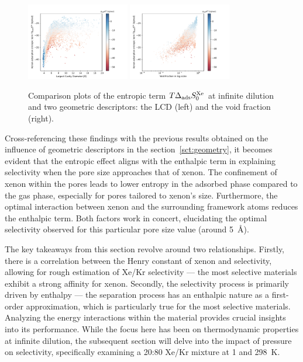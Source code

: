 \documentclass[main.tex]{subfiles}
\begin{document}
\begin{figure}
  \centering
  \includegraphics[width=0.4\textwidth]{figures/2-thermo/Scatterplot_entropy_lcd.pdf}
  \includegraphics[width=0.4\textwidth]{figures/2-thermo/Scatterplot_entropy_vf.pdf}
  \caption{Comparison plots of the entropic term $T\Delta_{\text{ads}}S^{\text{Xe}}_{\text{0}}$ at infinite dilution and two geometric descriptors: the LCD (left) and the void fraction (right).}\label{fgr:entropy_geometry}
\end{figure}

Cross-referencing these findings with the previous results obtained on the influence of geometric descriptors in the section~\ref{sct:geometry}, it becomes evident that the entropic effect aligns with the enthalpic term in explaining selectivity when the pore size approaches that of xenon. The confinement of xenon within the pores leads to lower entropy in the adsorbed phase compared to the gas phase, especially for pores tailored to xenon's size. Furthermore, the optimal interaction between xenon and the surrounding framework atoms reduces the enthalpic term. Both factors work in concert, elucidating the optimal selectivity observed for this particular pore size value (around \SI{5}{\angstrom}).

The key takeaways from this section revolve around two relationships. Firstly, there is a correlation between the Henry constant of xenon and selectivity, allowing for rough estimation of Xe/Kr selectivity --- the most selective materials exhibit a strong affinity for xenon. Secondly, the selectivity process is primarily driven by enthalpy --- the separation process has an enthalpic nature as a first-order approximation, which is particularly true for the most selective materials. Analyzing the energy interactions within the material provides crucial insights into its performance. While the focus here has been on thermodynamic properties at infinite dilution, the subsequent section will delve into the impact of pressure on selectivity, specifically examining a 20:80 Xe/Kr mixture at \SI{1}{\atm} and \SI{298}{\kelvin}. 
\end{document}
